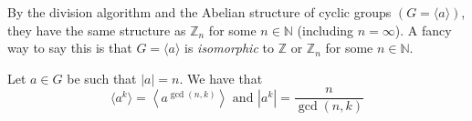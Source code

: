 \begin{remark}
    By the division algorithm and the Abelian structure of cyclic groups \((G = \langle a \rangle)\), they have the same structure as \(\mathbb{Z}_n\) for some \(n \in \mathbb{N}\) (including \(n = \infty\)). A fancy way to say this is that \(G = \langle a \rangle\) is \textit{isomorphic} to \(\mathbb{Z}\) or \(\mathbb{Z}_n\) for some \(n \in \mathbb{N}\).
\end{remark}

\begin{theorem}
    Let \(a \in G\) be such that \(|a| = n\). We have that
    \[
        \langle a^k \rangle = \left\langle a^{\gcd(n, k)} \right\rangle
        \text{ and }
        \left|a^k\right| = \frac{n}{\gcd(n, k)}
    \]
\end{theorem}
